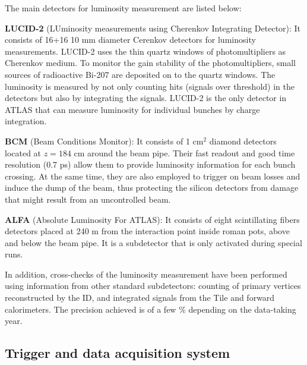 The main detectors for luminosity measurement are listed below:
\bi

\ib \textbf{LUCID-2} (LUminosity measurements using Cherenkov Integrating Detector): It consists of 16+16 10 mm diameter Cerenkov detectors for luminosity measurements. LUCID-2 uses the thin quartz windows of photomultipliers as Cherenkov medium. To monitor the gain stability of  the photomultipliers, small sources of radioactive Bi-207 are deposited on to the quartz windows. The luminosity is measured  by not only counting hits (signals over threshold) in the detectors but also by integrating the signals. LUCID-2 is the only detector in ATLAS that can measure luminosity for individual bunches by charge integration.

\ib \textbf{BCM} (Beam Conditions Monitor): It consists of 1 cm$^{2}$ diamond detectors located at $z = 184$ cm around the beam pipe. Their fast readout and good time resolution (0.7 ps) allow them to provide luminosity information for each bunch crossing. At the same time, they are also employed to trigger on beam losses and induce the dump of the beam, thus protecting the silicon detectors from damage that might result from an uncontrolled beam.

\ib \textbf{ALFA} (Absolute Luminosity For ATLAS): It consists of eight scintillating fibers detectors placed at 240 m from the interaction point inside roman pots, above and below the beam pipe. It is a subdetector that is only activated during special runs.

\ei
In addition, cross-checks of the luminosity measurement have been performed using information from other standard subdetectors: counting of primary vertices reconstructed by the ID, and integrated signals from the Tile and forward calorimeters. The precision achieved is of a few $\%$ depending on the data-taking year.

\subsection{Trigger and data acquisition system}

